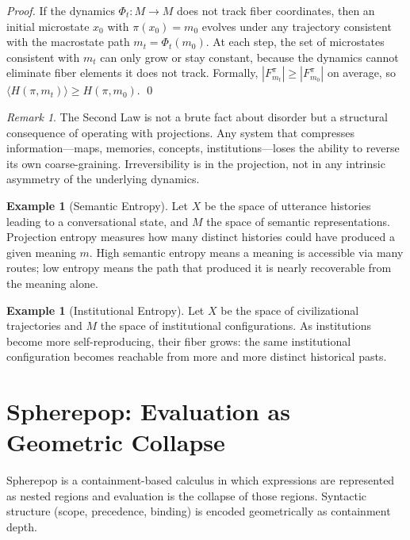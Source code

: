 \documentclass[12pt, a4paper, twoside]{article}
\theoremstyle{plain}
\theoremstyle{definition}
\newtheorem{example}[theorem]{Example}
\theoremstyle{remark}
\newtheorem{remark}[theorem]{Remark}
\newcommand{\Proj}{\pi}
\newcommand{\Fibover}[2]{F^{#1}_{#2}}
\newcommand{\Ent}{H}
\begin{document}
\begin{proof}
If the dynamics $\Phi_t: M \to M$ does not track fiber coordinates, then
an initial microstate $x_0$ with $\Proj(x_0) = m_0$ evolves under any
trajectory consistent with the macrostate path $m_t = \Phi_t(m_0)$. At
each step, the set of microstates consistent with $m_t$ can only grow or
stay constant, because the dynamics cannot eliminate fiber elements it does
not track. Formally, $|\Fibover{\Proj}{m_t}| \geq |\Fibover{\Proj}{m_0}|$
on average, so $\langle\Ent(\Proj, m_t)\rangle \geq \Ent(\Proj, m_0)$.
\qed
\end{proof}

\begin{remark}
The Second Law is not a brute fact about disorder but a structural consequence
of operating with projections. Any system that compresses information---maps,
memories, concepts, institutions---loses the ability to reverse its own
coarse-graining. Irreversibility is in the projection, not in any intrinsic
asymmetry of the underlying dynamics.
\end{remark}

\begin{example}[Semantic Entropy]
Let $X$ be the space of utterance histories leading to a conversational state,
and $M$ the space of semantic representations. Projection entropy measures how
many distinct histories could have produced a given meaning $m$. High semantic
entropy means a meaning is accessible via many routes; low entropy means the
path that produced it is nearly recoverable from the meaning alone.
\end{example}

\begin{example}[Institutional Entropy]
Let $X$ be the space of civilizational trajectories and $M$ the space of
institutional configurations. As institutions become more self-reproducing,
their fiber grows: the same institutional configuration becomes reachable
from more and more distinct historical pasts.
\end{example}

\section{Spherepop: Evaluation as Geometric Collapse}
\label{sec:spherepop}

Spherepop is a containment-based calculus in which expressions are represented
as nested regions and evaluation is the collapse of those regions. Syntactic
structure (scope, precedence, binding) is encoded geometrically as containment
depth.
\end{document}

